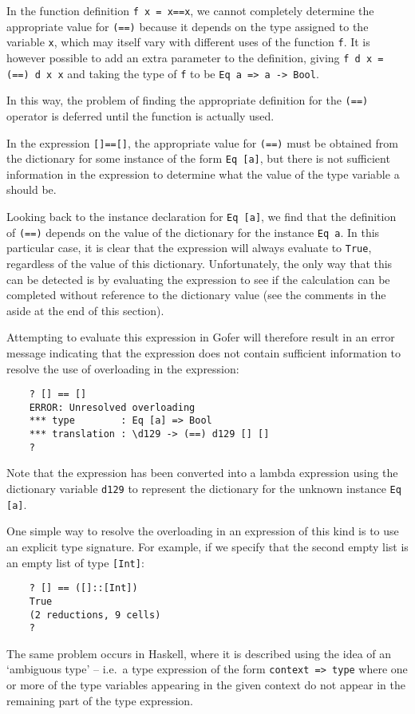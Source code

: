 \IT  In the function definition \verb"f x = x==x",  we  cannot  completely
     determine the appropriate value for \verb"(==)" because it depends on the
     type assigned to the variable \verb"x",  which  may  itself  vary  with
     different uses of the function \verb"f".  It is however possible to add
     an extra parameter to the definition,  giving \verb"f d x = (==) d x x"
     and taking the type of \verb"f" to be \verb"Eq a => a -> Bool".

     In this way, the problem of finding the appropriate definition for
     the \verb"(==)" operator is deferred until the function is actually used.

\IT  In the expression \verb"[]==[]", 
     the appropriate value for \verb"(==)" must be
     obtained from the dictionary for some instance of the form \verb"Eq [a]",
     but there is not  sufficient  information  in  the  expression  to
     determine what the value of the type variable a should be.

     Looking back to the instance declaration for \verb"Eq [a]", we find  that
     the definition of \verb"(==)" depends on the value of the dictionary  for
     the instance \verb"Eq a".  In this particular case, it is clear that  the
     expression will always evaluate to \verb"True", regardless of  the  value
     of this dictionary.  Unfortunately, the only way that this can  be
     detected is by evaluating the expression to see if the calculation
     can be completed without reference to the  dictionary  value  (see
     the comments in the aside at the end of this section).

     Attempting to evaluate this expression  in  Gofer  will  therefore
     result in an error message indicating that the expression does not
     contain sufficient information to resolve the use  of  overloading
     in the expression:
\begin{verbatim}
    ? [] == []
    ERROR: Unresolved overloading
    *** type        : Eq [a] => Bool
    *** translation : \d129 -> (==) d129 [] []
    ?
\end{verbatim}
     Note  that  the  expression  has  been  converted  into  a  lambda
     expression using the dictionary variable  \verb"d129"  to  represent  the
     dictionary for the unknown instance \verb"Eq [a]".

     One simple way to resolve the overloading in an expression of this
     kind is to use an explicit type signature.   For  example,  if  we
     specify that the second empty list is an empty list of type \verb"[Int]":
\begin{verbatim}
    ? [] == ([]::[Int])
    True
    (2 reductions, 9 cells)
    ?
\end{verbatim}
\EI
The same problem occurs in Haskell, where it  is  described  using  the
idea of an `ambiguous type' -- i.e.\  a  type  expression  of  the  form
\verb"context => type" where one or more of the type  variables  appearing  in
the given context do not appear in  the  remaining  part  of  the  type
expression.

